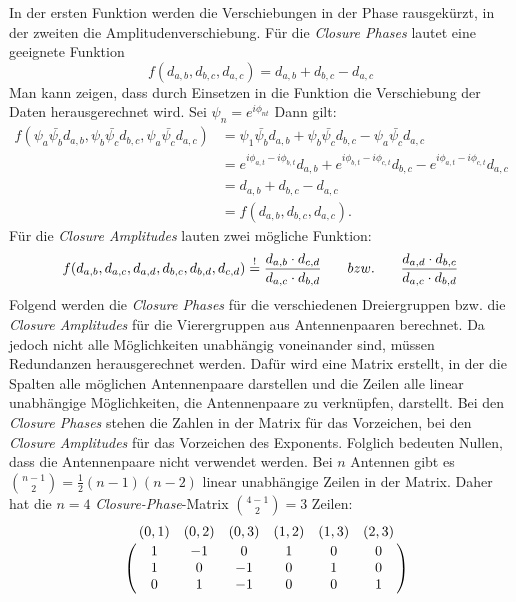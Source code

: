 In der ersten Funktion werden die Verschiebungen in der Phase rausgekürzt, in der zweiten die Amplitudenverschiebung.
Für die \emph{Closure Phases} lautet eine geeignete Funktion
\begin{equation}f(d_{a,b},d_{b,c},d_{a,c})=d_{a,b}+d_{b,c}-d_{a,c}\end{equation}
Man kann zeigen, dass durch Einsetzen in die Funktion die Verschiebung der Daten herausgerechnet wird. 
Sei $\psi_n = e^{i \phi_{nt}}$ Dann gilt:
\begin{align}
f(\psi_a\bar{\psi_b} d_{a,b},\psi_b\bar{\psi_c}d_{b,c},\psi_a \bar{\psi_c} d_{a,c})&=\psi_1\bar{\psi_b}d_{a,b}+\psi_b\bar{\psi_c}d_{b,c}-\psi_a \bar{\psi_c} d_{a,c}\\
&=e^{i \phi_{a,t}-i\phi_{b,t}}d_{a,b}+e^{i \phi_{b,t}-i\phi_{c,t}}d_{b,c}-e^{i \phi_{a,t}-i\phi_{c,t}}d_{a,c}\\
&=d_{a,b}+d_{b,c}-d_{a,c}\\
&=f(d_{a,b},d_{b,c},d_{a,c}).
\end{align}
Für die \emph{Closure Amplitudes} lauten zwei mögliche Funktion:
\begin{align}
f(d_{a, b},d_{a, c},d_{a, d},d_{b, c},d_{b, d},d_{c, d})\overset{!}{=}\frac{d_{a,b}\cdot d_{c,d}}{d_{a,c} \cdot d_{b,d}}
\hspace{3mm}\text \quad {bzw.} \quad \hspace{3mm} \frac{d_{a,d}\cdot d_{b,c}}{d_{a,c} \cdot d_{b,d}}
\end{align}
Folgend werden die \emph{Closure Phases} für die verschiedenen Dreiergruppen bzw. die \emph{Closure Amplitudes} für die Vierergruppen aus Antennenpaaren berechnet. Da jedoch nicht alle Möglichkeiten unabhängig voneinander sind, müssen Redundanzen herausgerechnet werden.
Dafür wird eine Matrix erstellt, in der die Spalten alle möglichen Antennenpaare darstellen und die Zeilen alle linear unabhängige Möglichkeiten, die Antennenpaare zu verknüpfen, darstellt. Bei den  \emph{Closure Phases} stehen die Zahlen in der Matrix für das Vorzeichen, bei den \emph{Closure Amplitudes} für das Vorzeichen des Exponents. Folglich bedeuten Nullen, dass die Antennenpaare nicht verwendet werden.  Bei $n$ Antennen gibt es $\binom{n-1}{2}= \frac{1}{2}(n-1)(n-2)$ linear unabhängige Zeilen in der Matrix. 
Daher hat die $n=4$ \emph{Closure-Phase}-Matrix $\binom{4-1}{2}=3$ Zeilen:
\begin{equation}
\bordermatrix{
~ &(0,1)&(0,2)&(0,3)&(1,2)&(1,3)&(2,3)\cr
~&1&-1&0&1&0&0 \cr
~&1&0&-1&0&1&0 \cr
~&0&1&-1&0&0&1 \cr}
\end{equation}

